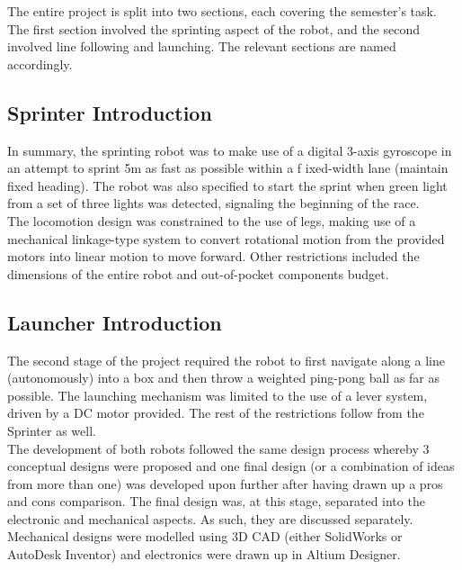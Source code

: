   The entire project is split into two sections, each covering the semester's task.  The first section involved the sprinting aspect of the robot, and the second involved line following and launching.  The relevant sections are named accordingly.

  \subsection{Sprinter Introduction}
  \label{sub:Sprinter Introduction}
    In summary, the sprinting robot was to make use of a digital 3-axis gyroscope in an attempt to sprint 5m as fast as possible within a f ixed-width lane (maintain fixed heading).  The robot was also specified to start the sprint when green light from a set of three lights was detected, signaling the beginning of the race. \\

    The locomotion design was constrained to the use of legs, making use of a mechanical linkage-type system to convert rotational motion from the provided motors into linear motion to move forward.  Other restrictions included the dimensions of the entire robot and out-of-pocket components budget.

  \subsection{Launcher Introduction}
  \label{sub:Launcher Introduction}
    The second stage of the project required the robot to first navigate along a line (autonomously) into a box and then throw a weighted ping-pong ball as far as possible. The launching mechanism was limited to the use of a lever system, driven by a DC motor provided.  The rest of the restrictions follow from the Sprinter as well. \\

  The development of both robots followed the same design process whereby 3 conceptual designs were proposed and one final design (or a combination of ideas from more than one) was developed upon further after having drawn up a pros and cons comparison.  The final design was, at this stage, separated into the electronic and mechanical aspects.  As such, they are discussed separately.  Mechanical designs were modelled using 3D CAD (either SolidWorks or AutoDesk Inventor) and electronics were drawn up in Altium Designer.


